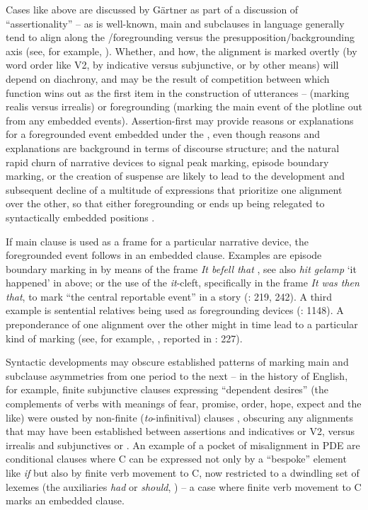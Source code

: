 \documentclass[output=paper,colorlinks,citecolor=brown]{langscibook}
\begin{document}
Cases like  above are discussed by Gärtner as part of a discussion of “assertionality” \citep[125--131]{Gärtner2001} – as is well-known, main and subclauses in language generally tend to align along the /foregrounding versus the presupposition/backgrounding axis (see, for example, \citealt{Cristofaro2003}). Whether, and how, the alignment is marked overtly (by word order like V2, by indicative versus subjunctive, or by other means) will depend on diachrony, and may be the result of competition between which function wins out as the first item in the construction of utterances –  (marking realis versus irrealis) or foregrounding (marking the main event of the plotline out from any embedded events). Assertion-first may provide reasons or explanations for a foregrounded event embedded under the , even though reasons and explanations are background in terms of discourse structure; and the natural rapid churn of narrative devices to signal peak marking, episode boundary marking, or the creation of suspense are likely to lead to the development and subsequent decline of a multitude of expressions that prioritize one alignment over the other, so that either foregrounding or  ends up being relegated to syntactically embedded positions \citep[216--230]{Los2015}. 

If main clause  is used as a frame for a particular narrative device, the foregrounded event follows in an embedded clause. Examples are episode boundary marking in  by means of the frame \textit{It befell that} \citep{Brinton1996}, see also \textit{hit gelamp} ‘it happened' in  above; or the use of the \textit{it}{}-cleft, specifically in the frame \textit{It was then that}, to mark “the central reportable event” in a story (\citealt{Los2015}: 219, 242). A third example is sentential relatives being used as foregrounding devices (\citealt{HuddlestonPullum2002}: 1148). A preponderance of one alignment over the other might in time lead to a particular kind of marking (see, for example, \citealt{GärtnerEythórsson2020}, reported in \citealt{ConiglioHinterhölzl2020}: 227). 

Syntactic developments may obscure established patterns of marking main and subclause asymmetries from one period to the next – in the history of English, for example, finite subjunctive clauses expressing “dependent desires” (the complements of verbs with meanings of fear, promise, order, hope, expect and the like) were ousted by non-finite (\textit{to}{}-infinitival) clauses \citep{Los2005}, obscuring any alignments that may have been established between assertions and indicatives or V2, versus irrealis and subjunctives or . An example of a pocket of misalignment in PDE are conditional clauses where C can be expressed not only by a “bespoke” element like \textit{if} but also by finite verb movement to C, now restricted to a dwindling set of lexemes (the auxiliaries \textit{had} or \textit{should}, \citealt{RobertsBiberauer2017}) – a case where finite verb movement to C marks an embedded clause.
\end{document}
